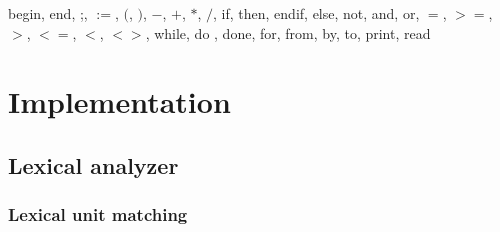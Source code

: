 \documentclass[12pt]{report}
\begin{document}
begin, end, ;, $:=$, $($, $)$, $-$, $+$, $*$, $/$, if, then, endif, else, not, and, or, $=$, $>=$, $>$, $<=$, $<$, $<>$, while, do , done, for, from, by, to, print, read

\chapter{Implementation}

\section{Lexical analyzer}

\subsection{Lexical unit matching}
\end{document}
